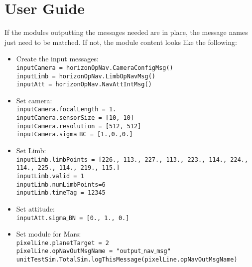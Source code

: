 
\section{User Guide}
If the modules outputting the messages needed are in place, the message names just need to be matched. If not, the module content looks like the following:

\begin{itemize}
\item Create the input messages: \\
\texttt{inputCamera = horizonOpNav.CameraConfigMsg()} \\
\texttt{inputLimb = horizonOpNav.LimbOpNavMsg()}\\
\texttt{inputAtt = horizonOpNav.NavAttIntMsg()}\\
\item Set camera: \\
\texttt{inputCamera.focalLength = 1.}\\
\texttt{inputCamera.sensorSize = [10, 10]}\\
\texttt{inputCamera.resolution = [512, 512]}\\
\texttt{inputCamera.sigma$\_$BC = [1.,0.,0.]}\\
\item Set Limb: \\
\texttt{inputLimb.limbPoints = [226., 113., 227., 113., 223., 114., 224., 114., 225., 114., 219.,
       115.]}\\
\texttt{inputLimb.valid = 1}\\
\texttt{inputLimb.numLimbPoints=6}\\
\texttt{inputLimb.timeTag = 12345}\\
\item Set attitude: \\
\texttt{inputAtt.sigma$\_$BN = [0., 1., 0.]}\\
\item Set module for Mars: \\
\texttt{pixelLine.planetTarget = 2}\\
\texttt{pixelLine.opNavOutMsgName = "output$\_$nav$\_$msg"}\\
\texttt{unitTestSim.TotalSim.logThisMessage(pixelLine.opNavOutMsgName)}\\
  \end{itemize}